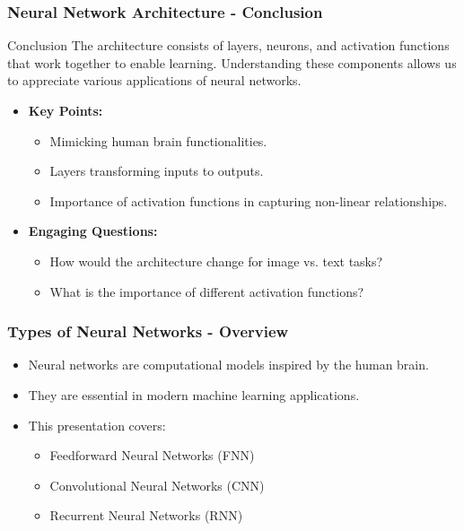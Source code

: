 \documentclass[aspectratio=169]{beamer}
\begin{document}
\begin{frame}[fragile]
    \frametitle{Neural Network Architecture - Conclusion}
    \begin{block}{Conclusion}
        The architecture consists of layers, neurons, and activation functions that work together to enable learning.
        Understanding these components allows us to appreciate various applications of neural networks.
    \end{block}
    \begin{itemize}
        \item \textbf{Key Points:}
            \begin{itemize}
                \item Mimicking human brain functionalities.
                \item Layers transforming inputs to outputs.
                \item Importance of activation functions in capturing non-linear relationships.
            \end{itemize}
        \item \textbf{Engaging Questions:}
            \begin{itemize}
                \item How would the architecture change for image vs. text tasks?
                \item What is the importance of different activation functions?
            \end{itemize}
    \end{itemize}
\end{frame}

\begin{frame}[fragile]
    \frametitle{Types of Neural Networks - Overview}
    \begin{itemize}
        \item Neural networks are computational models inspired by the human brain.
        \item They are essential in modern machine learning applications.
        \item This presentation covers:
        \begin{itemize}
            \item Feedforward Neural Networks (FNN)
            \item Convolutional Neural Networks (CNN)
            \item Recurrent Neural Networks (RNN)
        \end{itemize}
    \end{itemize}
\end{frame}
\end{document}
